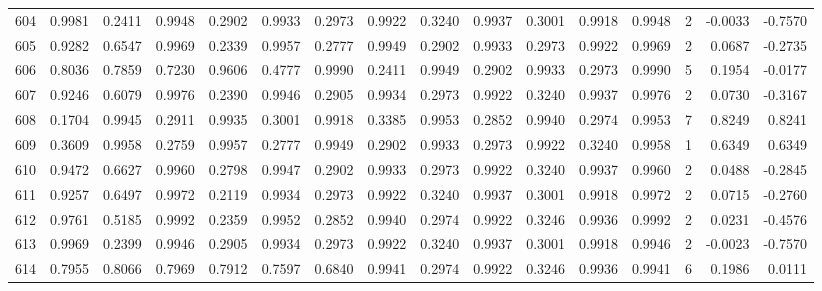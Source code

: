 \begin{tabular}{lrrrrrrrrrrrrrrr}
604 &      0.9981 &  0.2411 &  0.9948 &  0.2902 &  0.9933 &  0.2973 &  0.9922 &  0.3240 &  0.9937 &  0.3001 &   0.9918 &     0.9948 &      2 &                   -0.0033 &                    -0.7570 \\
605 &      0.9282 &  0.6547 &  0.9969 &  0.2339 &  0.9957 &  0.2777 &  0.9949 &  0.2902 &  0.9933 &  0.2973 &   0.9922 &     0.9969 &      2 &                    0.0687 &                    -0.2735 \\
606 &      0.8036 &  0.7859 &  0.7230 &  0.9606 &  0.4777 &  0.9990 &  0.2411 &  0.9949 &  0.2902 &  0.9933 &   0.2973 &     0.9990 &      5 &                    0.1954 &                    -0.0177 \\
607 &      0.9246 &  0.6079 &  0.9976 &  0.2390 &  0.9946 &  0.2905 &  0.9934 &  0.2973 &  0.9922 &  0.3240 &   0.9937 &     0.9976 &      2 &                    0.0730 &                    -0.3167 \\
608 &      0.1704 &  0.9945 &  0.2911 &  0.9935 &  0.3001 &  0.9918 &  0.3385 &  0.9953 &  0.2852 &  0.9940 &   0.2974 &     0.9953 &      7 &                    0.8249 &                     0.8241 \\
609 &      0.3609 &  0.9958 &  0.2759 &  0.9957 &  0.2777 &  0.9949 &  0.2902 &  0.9933 &  0.2973 &  0.9922 &   0.3240 &     0.9958 &      1 &                    0.6349 &                     0.6349 \\
610 &      0.9472 &  0.6627 &  0.9960 &  0.2798 &  0.9947 &  0.2902 &  0.9933 &  0.2973 &  0.9922 &  0.3240 &   0.9937 &     0.9960 &      2 &                    0.0488 &                    -0.2845 \\
611 &      0.9257 &  0.6497 &  0.9972 &  0.2119 &  0.9934 &  0.2973 &  0.9922 &  0.3240 &  0.9937 &  0.3001 &   0.9918 &     0.9972 &      2 &                    0.0715 &                    -0.2760 \\
612 &      0.9761 &  0.5185 &  0.9992 &  0.2359 &  0.9952 &  0.2852 &  0.9940 &  0.2974 &  0.9922 &  0.3246 &   0.9936 &     0.9992 &      2 &                    0.0231 &                    -0.4576 \\
613 &      0.9969 &  0.2399 &  0.9946 &  0.2905 &  0.9934 &  0.2973 &  0.9922 &  0.3240 &  0.9937 &  0.3001 &   0.9918 &     0.9946 &      2 &                   -0.0023 &                    -0.7570 \\
614 &      0.7955 &  0.8066 &  0.7969 &  0.7912 &  0.7597 &  0.6840 &  0.9941 &  0.2974 &  0.9922 &  0.3246 &   0.9936 &     0.9941 &      6 &                    0.1986 &                     0.0111 \\

\end{tabular}
